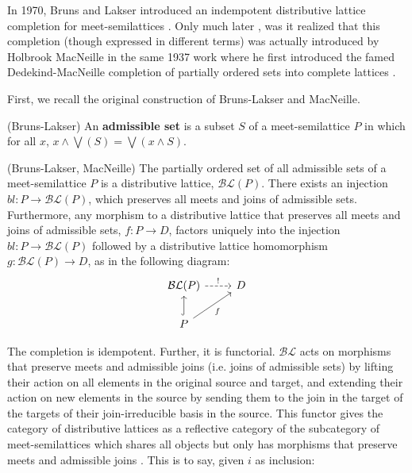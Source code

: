 \documentclass[a4paper,USenglish,cleveref, autoref, thm-restate,authorcolumns]{lipics-v2019}
\newcommand{\BLc}{\mathcal{BL}}
\begin{document}
In 1970, Bruns and Lakser introduced an indempotent distributive lattice completion for meet-semilattices \cite{bruns1970injective}. Only much later \cite{ball2016dedekind}, was it realized that this completion (though expressed in different terms) was actually introduced by  Holbrook MacNeille in the same 1937 work where he first introduced the famed Dedekind-MacNeille completion of partially ordered sets into complete lattices \cite{macneille1937partially}. 

First, we recall the original construction of Bruns-Lakser and MacNeille.

\begin{definition}
(Bruns-Lakser) An \textbf{admissible set} is a subset \(S\) of a meet-semilattice \(P\) in which for all \(x\), \(x \wedge \bigvee(S) = \bigvee(x \wedge S)\).
\end{definition}

\begin{theorem}
(Bruns-Lakser, MacNeille) The partially ordered set of all admissible sets of a meet-semilattice \(P\) is a distributive lattice, \(\BLc(P)\). There exists an injection \(bl : P \rightarrow \BLc(P)\), which preserves all meets and joins of admissible sets. Furthermore, any morphism to a distributive lattice that preserves all meets and joins of admissible sets, \(f : P \rightarrow D\), factors uniquely into the injection \(bl : P \rightarrow \BLc(P)\) followed by a distributive lattice homomorphism \(g : \BLc(P) \rightarrow D\), as in the following diagram:
\begin{equation*}
\begin{tikzcd}
\BLc(P) \arrow[r, "!",dashed]            & D \\
P \arrow[u, hook] \arrow[ru, "f"'] &
\end{tikzcd}
\end{equation*}

\end{theorem}

The completion is idempotent. Further, it is functorial. \(\BLc\) acts on morphisms that preserve meets and admissible joins (i.e. joins of admissible sets) by lifting their action on all elements in the original source and target, and extending their action on new elements in the source by sending them to the join in the target of the targets of their join-irreducible basis in the source. This functor gives the category of distributive lattices as a reflective category of the subcategory of meet-semilattices which shares all objects but only has morphisms that preserve meets and admissible joins \cite{gehrke2014distributive}. This is to say, given \(i\) as inclusion:
\end{document}
